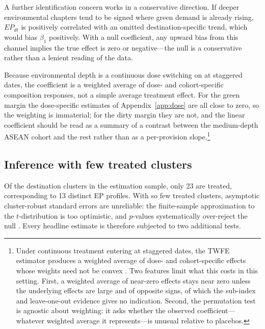 \documentclass[12pt]{article}
\begin{document}
A further identification concern works in a conservative direction. If deeper
environmental chapters tend to be signed where green demand is already rising,
$EP_{dt}$ is positively correlated with an omitted destination-specific trend,
which would bias $\beta_1$ positively. With a null coefficient, any upward bias from this channel implies the true effect is zero or negative---the null is a conservative rather than a lenient reading of the data.

Because environmental depth is a continuous dose switching on at staggered dates,
the coefficient is a weighted average of dose- and cohort-specific composition
responses, not a simple average treatment effect. For the green margin the dose-specific estimates of Appendix~\ref{app:dose} are all close to zero, so the weighting is immaterial; for the dirty margin they are not, and the linear coefficient should be read as a summary of a contrast between the medium-depth ASEAN cohort and the rest rather than as a per-provision slope.\footnote{Under continuous treatment entering at
staggered dates, the TWFE estimator produces a weighted average of dose- and
cohort-specific effects whose weights need not be convex
\citep{callaway2024, goodmanbacon2021, dechaisemartin2020}. Two features limit
what this costs in this setting. First, a weighted average of near-zero effects
stays near zero unless the underlying effects are large and of opposite signs, of
which the sub-index and leave-one-out evidence gives no indication. Second, the
permutation test is agnostic about weighting: it asks whether the observed
coefficient---whatever weighted average it represents---is unusual relative to
placebos.}

\subsection{Inference with few treated clusters}\label{sec:inference}

Of the destination clusters in the estimation sample, only 23 are treated,
corresponding to 13 distinct EP profiles. With so few treated
clusters, asymptotic cluster-robust standard errors are unreliable: the
finite-sample approximation to the $t$-distribution is too optimistic, and
$p$-values systematically over-reject the null
\citep{cameron2008, mackinnon2017}. Every headline estimate is therefore subjected
to two additional tests.
\end{document}
